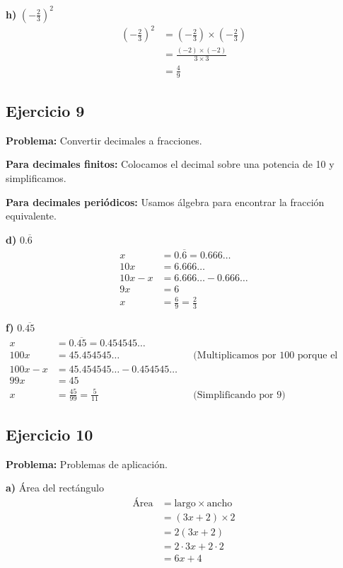 \textbf{h)} $\left(-\frac{2}{3}\right)^2$
\begin{align}
\left(-\frac{2}{3}\right)^2 &= \left(-\frac{2}{3}\right) \times \left(-\frac{2}{3}\right)\\
&= \frac{(-2) \times (-2)}{3 \times 3}\\
&= \frac{4}{9}
\end{align}

\subsection*{Ejercicio 9}

\textbf{Problema:} Convertir decimales a fracciones.

\textbf{Para decimales finitos:}
Colocamos el decimal sobre una potencia de 10 y simplificamos.

\textbf{Para decimales periódicos:}
Usamos álgebra para encontrar la fracción equivalente.

\textbf{d)} $0.\overline{6}$
\begin{align}
x &= 0.\overline{6} = 0.666\ldots\\
10x &= 6.666\ldots\\
10x - x &= 6.666\ldots - 0.666\ldots\\
9x &= 6\\
x &= \frac{6}{9} = \frac{2}{3}
\end{align}

\textbf{f)} $0.\overline{45}$
\begin{align}
x &= 0.\overline{45} = 0.454545\ldots\\
100x &= 45.454545\ldots && \text{(Multiplicamos por 100 porque el periodo tiene 2 dígitos)}\\
100x - x &= 45.454545\ldots - 0.454545\ldots\\
99x &= 45\\
x &= \frac{45}{99} = \frac{5}{11} && \text{(Simplificando por 9)}
\end{align}

\subsection*{Ejercicio 10}

\textbf{Problema:} Problemas de aplicación.

\textbf{a)} Área del rectángulo
\begin{align}
\text{Área} &= \text{largo} \times \text{ancho}\\
&= (3x + 2) \times 2\\
&= 2(3x + 2)\\
&= 2 \cdot 3x + 2 \cdot 2\\
&= 6x + 4
\end{align}

